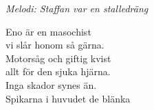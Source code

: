 {\footnotesize\textit{Melodi: Staffan var en stalledräng}}\par
\vspace{10pt}
Eno är en masochist\\
vi slår honom så gärna.\\
Motorsåg och giftig kvist\\
allt för den sjuka hjärna.\\
Inga skador synes än.\\
Spikarna i huvudet de blänka
